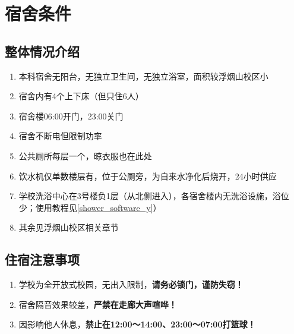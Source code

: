 \section[宿舍条件]{宿舍条件}

\subsection[整体情况介绍]{整体情况介绍}
\begin{enumerate}
    \item 本科宿舍无阳台，无独立卫生间，无独立浴室，面积较浮烟山校区小
    \item 宿舍内有4个上下床（但只住6人）
    \item 宿舍楼06:00开门，23:00关门
    \item 宿舍不断电但限制功率\footnotemark
    \item 公共厕所每层一个，晾衣服也在此处
    \item 饮水机仅单数楼层有，位于公厕旁，为自来水净化后烧开，24小时供应
    \item 学校洗浴中心在3号楼负1层（从北侧进入），各宿舍楼内无洗浴设施，浴位少；使用教程见\uline{\ref{shower_software_y}}）
    \item 其余见浮烟山校区相关章节
\end{enumerate}

\subsection[住宿注意事项]{住宿注意事项}
\begin{enumerate}
    \item 学校为全开放式校园，无出入限制，\textbf{请务必锁门，谨防失窃！}
    \item 宿舍隔音效果较差，\textbf{严禁在走廊大声喧哗！}
    \item 因影响他人休息，\textbf{禁止在12:00～14:00、23:00～07:00打篮球！}
\end{enumerate}